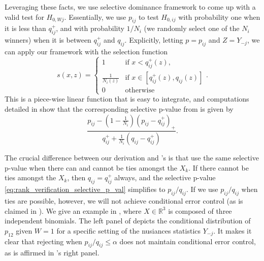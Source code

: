 \documentclass{article}
\newcommand{\R}{\mathbb{R}}
\begin{document}
Leveraging these facts, we use selective dominance framework to come up with a valid test for $H_{0, Wj}$. Essentially, we use $p_{ij}$ to test $H_{0, ij}$ with probability one when it is less than $q^+_{ij}$, and with probability $1/N_i$ (we randomly select one of the $N_i$ winners) when it is between $q^+_{ij}$ and $q_{ij}$. Explicitly, letting $p = p_{ij}$ and $Z = Y_{-j}$, we can apply our framework with the selection function
\begin{equation*}
    s(x, z) = 
    \begin{cases} 
    1 & \text{if } x < q_{ij}^+(z), \\
    \frac{1}{N_i(z)} & \text{if } x \in [q_{ij}^+(z), q_{ij}(z)] \\
    0 & \text{otherwise}
    \end{cases}.
\end{equation*}
This is a piece-wise linear function that is easy to integrate, and computations detailed in  show that the corresponding selective p-value from  is given by 
\begin{equation}
    \label{eq:rank_verification_selective_p_val}
     \frac{p_{ij} - \left(1 - \frac{1}{N_i} \right)(p_{ij} - q^+_{ij})_+ }{q^+_{ij} + \frac{1}{N_i}(q_{ij} - q^+_{ij}) }.
\end{equation}

The crucial difference between our derivation and \cite{Hung2019}'s is that \cite{Hung2019} use the same selective p-value when there can and cannot be ties amongst the $X_k$. If there cannot be ties amongst the $X_k$, then $q_{ij} = q^{+}_{ij}$ always, and the selective p-value \eqref{eq:rank_verification_selective_p_val} simplifies to $p_{ij}/q_{ij}$. If we use $p_{ij}/q_{ij}$ when ties are possible, however, we will not achieve conditional error control (as is claimed in \cite{Hung2019}). We give an example in , where $X \in \R^3$ is composed of three independent binomials. The left panel of  depicts the conditional distribution of $p_{12}$ given $W=1$ for a specific setting of the nusiances statistics $Y_{-j}$. It makes it clear that rejecting when $p_{ij}/q_{ij} \leq \alpha $ does not maintain conditional error control, as is affirmed in 's right panel.
\end{document}
